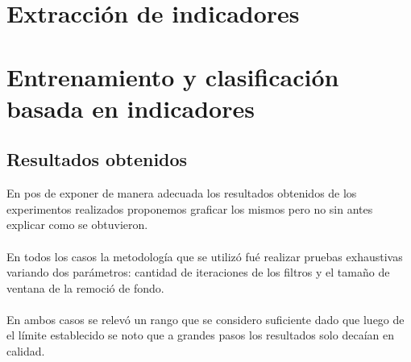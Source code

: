 \section{Extracci\'on de indicadores}

\section{Entrenamiento y clasificaci\'on basada en indicadores}


\subsection{Resultados obtenidos}

En pos de exponer de manera adecuada los resultados obtenidos de los experimentos realizados proponemos graficar los mismos pero no sin antes explicar como se obtuvieron.
\paragraph{}
En todos los casos la metodolog\'ia que se utiliz\'o fu\'e realizar pruebas exhaustivas variando dos par\'ametros: cantidad de iteraciones de los filtros y el tamaño de ventana de la remoci\'o de fondo.
\paragraph{}
En ambos casos se relev\'o un rango que se considero suficiente dado que luego de el límite establecido se noto que a grandes pasos los resultados solo deca\'ian en calidad.

